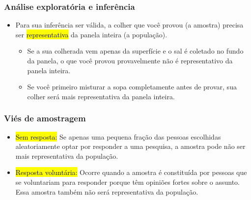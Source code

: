 \begin{frame}
\frametitle{Análise exploratória e inferência}

\begin{itemize}

\justifying
\item Para sua inferência ser válida, a colher que você provou (a amostra) precisa ser \hl{representativa} da panela inteira (a população).

\begin{itemize}
\justifying
\item Se a sua colherada vem apenas da superfície e o sal é coletado no fundo da panela, o que você provou provavelmente não é representativo da panela inteira.
\vspace{0.1cm}
\justifying
\item Se você primeiro misturar a sopa completamente antes de provar, sua colher será mais representativa da panela inteira.
\end{itemize}

\end{itemize}

\end{frame}


\begin{frame}
\frametitle{Viés de amostragem}

\begin{itemize}
\justifying
\item \hl{Sem resposta:} Se apenas uma pequena fração das pessoas escolhidas aleatoriamente optar por responder a uma pesquisa, a amostra pode não ser mais representativa da população.
\vspace{0.1cm}
\pause
\justifying
\item \hl{Resposta voluntária:} Ocorre quando a amostra é constituída por pessoas que se voluntariam para responder porque têm opiniões fortes sobre o assunto. Essa amostra também não será representativa da população.

\end{itemize}

\end{frame}


